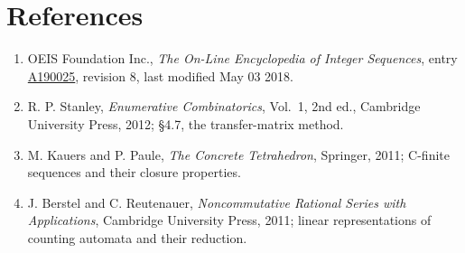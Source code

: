 \documentclass[11pt]{article}
\theoremstyle{definition}
\begin{document}
\section{References}

\begin{enumerate}

\item OEIS Foundation Inc., \emph{The On-Line Encyclopedia of Integer Sequences}, entry \href{https://oeis.org/A190025}{A190025}, revision 8, last modified May 03 2018.

\item R. P. Stanley, \emph{Enumerative Combinatorics}, Vol.~1, 2nd ed., Cambridge University Press, 2012; \S4.7, the transfer-matrix method.

\item M. Kauers and P. Paule, \emph{The Concrete Tetrahedron}, Springer, 2011; C-finite sequences and their closure properties.

\item J. Berstel and C. Reutenauer, \emph{Noncommutative Rational Series with Applications}, Cambridge University Press, 2011; linear representations of counting automata and their reduction.

\end{enumerate}
\end{document}

